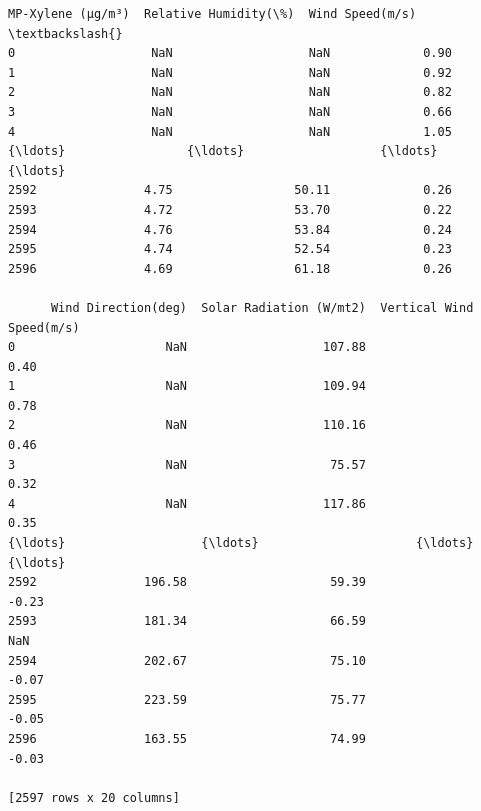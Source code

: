 \documentclass[11pt]{article}
\begin{document}
\begin{tcolorbox}[breakable, size=fbox, boxrule=.5pt, pad at break*=1mm, opacityfill=0]
\begin{Verbatim}[commandchars=\\\{\}]
      MP-Xylene (µg/m³)  Relative Humidity(\%)  Wind Speed(m/s)  \textbackslash{}
0                   NaN                   NaN             0.90
1                   NaN                   NaN             0.92
2                   NaN                   NaN             0.82
3                   NaN                   NaN             0.66
4                   NaN                   NaN             1.05
{\ldots}                 {\ldots}                   {\ldots}              {\ldots}
2592               4.75                 50.11             0.26
2593               4.72                 53.70             0.22
2594               4.76                 53.84             0.24
2595               4.74                 52.54             0.23
2596               4.69                 61.18             0.26

      Wind Direction(deg)  Solar Radiation (W/mt2)  Vertical Wind Speed(m/s)
0                     NaN                   107.88                      0.40
1                     NaN                   109.94                      0.78
2                     NaN                   110.16                      0.46
3                     NaN                    75.57                      0.32
4                     NaN                   117.86                      0.35
{\ldots}                   {\ldots}                      {\ldots}                       {\ldots}
2592               196.58                    59.39                     -0.23
2593               181.34                    66.59                       NaN
2594               202.67                    75.10                     -0.07
2595               223.59                    75.77                     -0.05
2596               163.55                    74.99                     -0.03

[2597 rows x 20 columns]
\end{Verbatim}
\end{tcolorbox}
        
\end{document}
